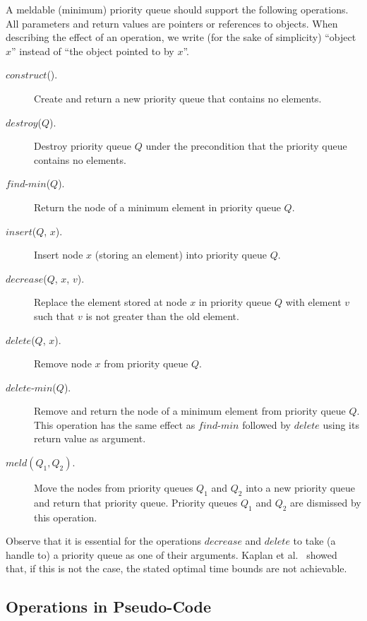 \documentclass{llncs}
\newcommand{\Construct}{\mbox{$\mathit{construct}$}}
\newcommand{\Destroy}{\mbox{$\mathit{destroy}$}}
\newcommand{\Findmin}{\mbox{$\mathit{find}$\mbox{\rm -}$\mathit{min}$}}
\newcommand{\Insert}{\mbox{$\mathit{insert}$}}
\newcommand{\Deletemin}{\mbox{$\mathit{delete}$\mbox{\rm -}$\mathit{min}$}}
\newcommand{\Decrease}{\mbox{$\mathit{decrease}$}}
\newcommand{\Delete}{\mbox{$\mathit{delete}$}}
\newcommand{\Meld}{\mbox{$\mathit{meld}$}}
\begin{document}
A meldable (minimum) priority queue should support the following operations. All
parameters and return values are pointers or references to
objects. When describing the effect of an operation, we write (for the
sake of simplicity) ``object $x$'' instead of ``the object pointed to
by $x$''.
\begin{description}
\item[\Construct{}().] Create and return a new priority queue that
  contains no elements.

\item[\Destroy{}($Q$).] Destroy priority queue $Q$ under the
  precondition that the priority queue contains no elements.

\item[\Findmin{}($Q$).] Return the node of a minimum
  element in priority queue $Q$.

\item[\Insert{}($Q$, $x$).] Insert node $x$ (storing an
  element) into priority queue $Q$.

\item[\Decrease{}($Q$, $x$, $v$).] Replace the element
  stored at node $x$ in priority queue $Q$ with element $v$ such
  that $v$ is not greater than the old element.

\item[\Delete{}($Q$, $x$).]  Remove node $x$ from priority queue $Q$.

\item[\Deletemin{}($Q$).] Remove and return the node of a minimum
  element from priority queue $Q$. This operation has the same effect as
  \Findmin{} followed by \Delete{} using its return value as argument.

\item[$\Meld{}(Q_1, Q_2)$.] Move the nodes from priority queues $Q_1$
  and $Q_2$ into a new priority queue and return that priority queue.
  Priority queues $Q_1$ and $Q_2$ are dismissed by this operation.
\end{description}
Observe that it is essential for the operations \Decrease{} and
\Delete{} to take (a handle to) a priority queue as one of their arguments. Kaplan
et al.~\cite{KST02} showed that, if this is not the case, the stated optimal
time bounds are not achievable.

\subsection{Operations in Pseudo-Code}
\end{document}
